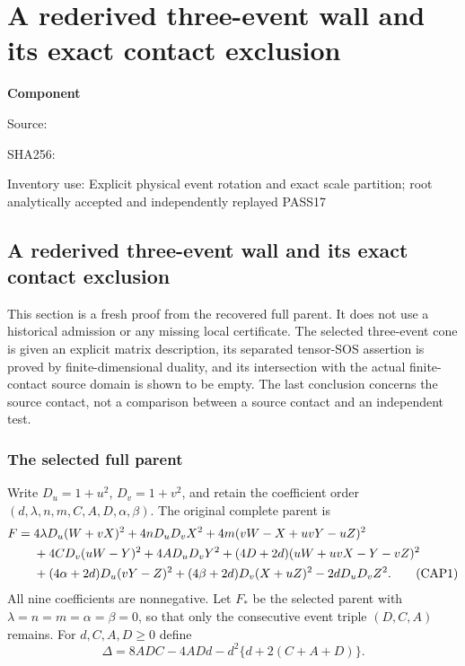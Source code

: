 \chapter{A rederived three-event wall and its exact contact exclusion}
\label{component:p23a094ff816d}
\noindent\textbf{Component }\par
{\small\noindent Source: \par}
{\small\noindent SHA256: \par}
{\small\noindent Inventory use: Explicit physical event rotation and exact scale partition; root analytically accepted and independently replayed PASS17\par}
\medskip
\section{A rederived three-event wall and its exact contact exclusion}
\label{p23a094ff816d:sec:rederived-three-event-contact}

This section is a fresh proof from the recovered full parent.  It does
not use a historical admission or any missing local certificate.  The
selected three-event cone is given an explicit matrix description, its
separated tensor-SOS assertion is proved by finite-dimensional duality,
and its intersection with the actual finite-contact source domain is
shown to be empty.  The last conclusion concerns the source contact,
not a comparison between a source contact and an independent test.

\subsection{The selected full parent}

Write $D_u=1+u^2$, $D_v=1+v^2$, and retain the coefficient order
$(d,\lambda,n,m,C,A,D,\alpha,\beta)$.  The original complete parent is
\begin{align}
F={}&4\lambda D_u(W+vX)^2+4nD_uD_vX^2
 +4m(vW-X+uvY-uZ)^2\notag\\
&+4CD_v(uW-Y)^2+4AD_uD_vY^2
 +(4D+2d)(uW+uvX-Y-vZ)^2\notag\\
&+(4\alpha+2d)D_u(vY-Z)^2
 +(4\beta+2d)D_v(X+uZ)^2-2dD_uD_vZ^2.
\tag{CAP1}
\end{align}
All nine coefficients are nonnegative.  Let $F_*$ be the selected parent
with $\lambda=n=m=\alpha=\beta=0$, so that only the consecutive event
triple $(D,C,A)$ remains.  For $d,C,A,D\geq0$ define
\[
\Delta=8ADC-4ADd-d^2\{d+2(C+A+D)\}.
\tag{CAP2}
\]

